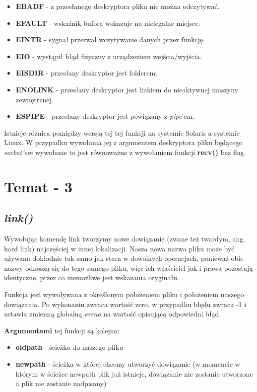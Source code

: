 \documentclass{article}
\begin{document}
\begin{itemize}
\item \textbf{EBADF} - z przesłanego deskryptora pliku nie można odczytywać.
\item \textbf{EFAULT} - wskaźnik bufora wskazuje na nielegalne miejsce.
\item \textbf{EINTR} - sygnał przerwał wczytywanie danych przez funkcję.
\item \textbf{EIO} - wystąpił błąd fizyczny z urządzeniem wejścia/wyjścia.
\item \textbf{EISDIR} - przesłany deskryptor jest folderem.
\item \textbf{ENOLINK} - przesłany deskryptor jest linkiem do nieaktywnej maszyny zewnętrznej.
\item \textbf{ESPIPE} - przesłany deskryptor jest powiązany z \textit{pipe}'em.
\end{itemize}

Istnieje różnica pomiędzy wersją tej tej funkcji na systemie Solaris a systemie Linux.
W przypadku wywołania jej z argumentem deskryptora pliku będącego \textit{socket'em} wywołanie to jest równoważne z wywołaniem funkcji \textbf{recv()} bez flag.

  
\section{Temat - 3}
\subsection{\textit{link()}}
Wywołując komendę link tworzymy nowe dowiązanie (zwane też twardym, ang. hard link) najczęściej w innej lokalizacji. Nasza nowa nazwa pliku może być używana dokładnie tak samo jak stara w dowolnych operacjach, ponieważ obie nazwy odnoszą się do tego samego pliku, więc ich właściciel jak i prawa pozostają identyczne, przez co niemożliwe jest wskazania oryginału.

Funkcja jest wywoływana z określonym położeniem pliku i położeniem naszego dowiązania. Po wykonaniu zwraca wartość zero, w przypadku błędu zwraca -1 i ustawia zmienną globalną \textit{errno} na wartość opisującą odpowiedni błąd.


\textbf{Argumentami} tej funkcji są kolejno:
\begin{itemize}
\item \textbf{oldpath} - ścieżka do naszego pliku
\item \textbf{newpath} - ścieżka w której chcemy utworzyć dowiązanie (w momencie w którym w ścieżce newpath plik już istnieje, dowiązanie nie zostanie utworzone a plik nie zostanie nadpisany)
\end{itemize}
\end{document}
